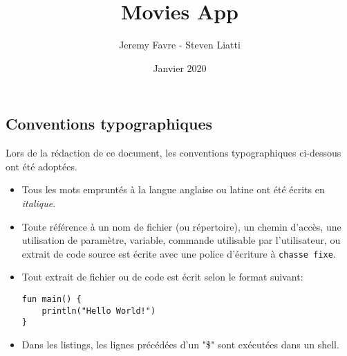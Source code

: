 \documentclass[a4paper, 12pt]{article}
\newenvironment{code}{\captionsetup{type=listing}}{}
\begin{document}
\title{Movies App}
\author{Jeremy Favre - Steven Liatti}
\date{Janvier 2020}
\maketitle
\newpage


\tableofcontents
\newpage
{}
\listoffigures
\newpage
\renewcommand{\listtablename}{Table des tables}
\listoftables
\newpage
\renewcommand\listoflistingscaption{Table des listings de code source}
\listoflistings
\newpage

\subsection*{Conventions typographiques} %
Lors de la rédaction de ce document, les conventions typographiques ci-dessous ont
été adoptées.
\begin{itemize}[label=\textbullet]
	\item Tous les mots empruntés à la langue anglaise ou latine ont été écrits en \textit{italique}.
	\item Toute référence à un nom de fichier (ou répertoire), un chemin d'accès, une 
    utilisation de paramètre, variable, commande utilisable par l'utilisateur, ou extrait de code 
    source est écrite avec une police d'écriture à \texttt{chasse fixe}.
	\item Tout extrait de fichier ou de code est écrit selon le format suivant:
    \bigbreak
    \begin{code}
        \begin{verbatim}
fun main() {
    println("Hello World!")
}
        \end{verbatim}
    \end{code}
    \item Dans les listings, les lignes précédées d'un "\$" sont exécutées dans un shell.
\end{itemize}

\newpage

\printglossary[type=\acronymtype,title={Acronymes}]
\newpage
\end{document}
